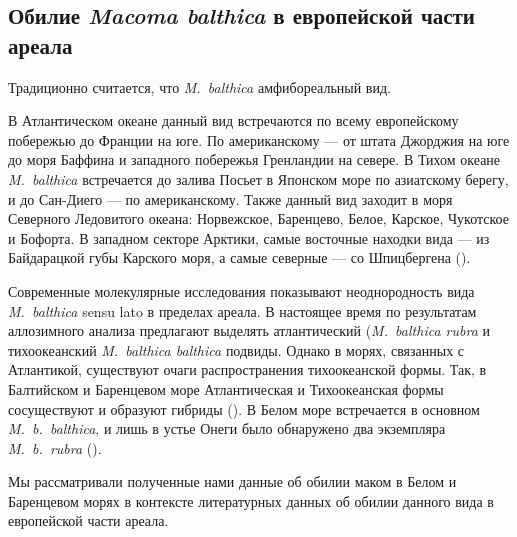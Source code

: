 		\subsection{Обилие {\it Macoma balthica} в европейской части ареала}
Традиционно считается, что {\it M.~balthica} амфибореальный вид. 

В Атлантическом океане данный вид встречаются по всему европейскому побережью до Франции на юге. 
По американскому --- от штата Джорджия на юге до моря Баффина и западного побережья Гренландии на севере. 
В Тихом океане {\it M.~balthica} встречается до залива Посьет в Японском море по азиатскому берегу, и до Сан-Диего --- по американскому. 
Также данный вид заходит в моря Северного Ледовитого океана:  Норвежское, Баренцево, Белое, Карское, Чукотское и Бофорта. 
В западном секторе Арктики, самые восточные находки вида --- из Байдарацкой губы Карского моря, а самые северные --- со Шпицбергена (\cite{Semenova_1974, Kafanov_1985, Maximovich_1985, Meehan_1985, Naumov_Skorobogatov_1987, Meehan_et_al_1989, Hummel_et_al_1997}).

Современные молекулярные исследования показывают неоднородность вида {\it M.~balthica} sensu lato в пределах ареала. 
В настоящее время по результатам аллозимного анализа предлагают выделять атлантический ({\it M.~balthica rubra} и тихоокеанский {\it M.~balthica balthica} подвиды.
Однако  в морях, связанных с  Атлантикой, существуют очаги распространения тихоокеанской формы. 
Так, в Балтийском и Баренцевом море Атлантическая и Тихоокеанская формы сосуществуют и образуют гибриды (\cite{Vainola_2003}). 
В Белом море встречается в основном {\it M.~b.~balthica}, и лишь в устье Онеги было обнаружено два экземпляра {\it M.~b.~rubra} (\cite{Nikula_et_al_2007}).

Мы рассматривали полученные нами данные об обилии маком в Белом и Баренцевом морях в контексте литературных данных об обилии данного вида в европейской части ареала.

